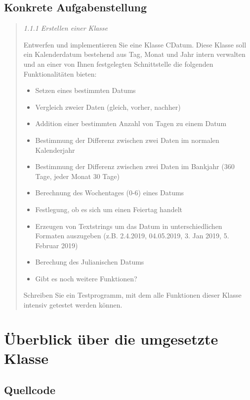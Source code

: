 \documentclass[12pt,pdftex,parskip=half]{scrartcl}
\begin{document}
  \subsection{Konkrete Aufgabenstellung}
    \begin{quote}
      \itshape %
      1.1.1 Erstellen einer Klasse

      Entwerfen und implementieren Sie eine Klasse CDatum. Diese Klasse soll ein Kalenderdatum bestehend aus Tag, Monat und Jahr intern verwalten und an einer von Ihnen festgelegten Schnittstelle die folgenden Funktionalitäten bieten:

      \begin{itemize}
        \item Setzen eines bestimmten Datums
        \item Vergleich zweier Daten (gleich, vorher, nachher)
        \item Addition einer bestimmten Anzahl von Tagen zu einem Datum
        \item Bestimmung der Differenz zwischen zwei Daten im normalen Kalenderjahr
        \item Bestimmung der Differenz zwischen zwei Daten im Bankjahr (360 Tage, jeder Monat 30 Tage)
        \item Berechnung des Wochentages (0-6) eines Datums
        \item Festlegung, ob es sich um einen Feiertag handelt
        \item Erzeugen von Textstrings um das Datum in unterschiedlichen Formaten auszugeben
          (z.B. 2.4.2019, 04.05.2019, 3. Jan 2019, 5. Februar 2019)
        \item Berechung des Julianischen Datums
        \item Gibt es noch weitere Funktionen?
      \end{itemize}

      Schreiben Sie ein Testprogramm, mit dem alle Funktionen dieser Klasse intensiv getestet werden können.
    \end{quote}

    \clearpage


\section{Überblick über die umgesetzte Klasse}

    \subsection{Quellcode}
\end{document}
